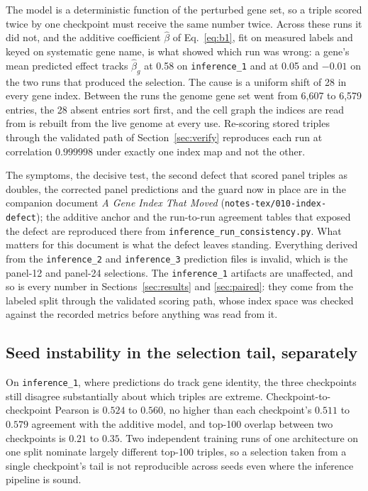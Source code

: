 The model is a deterministic function of the perturbed gene set, so a triple
scored twice by one checkpoint must receive the same number twice. Across these
runs it did not, and the additive coefficient $\hat{\beta}$ of Eq.~\ref{eq:b1},
fit on measured labels and keyed on systematic gene name, is what showed which
run was wrong: a gene's mean predicted effect tracks $\hat{\beta}_g$ at 0.58 on
\texttt{inference\_1} and at 0.05 and $-0.01$ on the two runs that produced the
selection. The cause is a uniform shift of 28 in every gene index. Between the
runs the genome gene set went from 6{,}607 to 6{,}579 entries, the 28 absent
entries sort first, and the cell graph the indices are read from is rebuilt from
the live genome at every use. Re-scoring stored triples through the validated
path of Section~\ref{sec:verify} reproduces each run at correlation $0.999998$
under exactly one index map and not the other.

The symptoms, the decisive test, the second defect that scored panel triples as
doubles, the corrected panel predictions and the guard now in place are in the
companion document \emph{A Gene Index That Moved}
(\texttt{notes-tex/010-index-defect}); the additive anchor and the run-to-run
agreement tables that exposed the defect are reproduced there from
\texttt{inference\_run\_consistency.py}. What matters for this document is what
the defect leaves standing. Everything derived from the \texttt{inference\_2}
and \texttt{inference\_3} prediction files is invalid, which is the panel-12 and
panel-24 selections. The \texttt{inference\_1} artifacts are unaffected, and so
is every number in Sections~\ref{sec:results} and \ref{sec:paired}: they come
from the labeled split through the validated scoring path, whose index space was
checked against the recorded metrics before anything was read from it.

\subsection{Seed instability in the selection tail, separately}

On \texttt{inference\_1}, where predictions do track gene identity, the three
checkpoints still disagree substantially about which triples are extreme.
Checkpoint-to-checkpoint Pearson is $0.524$ to $0.560$, no higher than each
checkpoint's $0.511$ to $0.579$ agreement with the additive model, and top-100
overlap between two checkpoints is $0.21$ to $0.35$. Two independent training
runs of one architecture on one split nominate largely different top-100
triples, so a selection taken from a single checkpoint's tail is not
reproducible across seeds even where the inference pipeline is sound.
